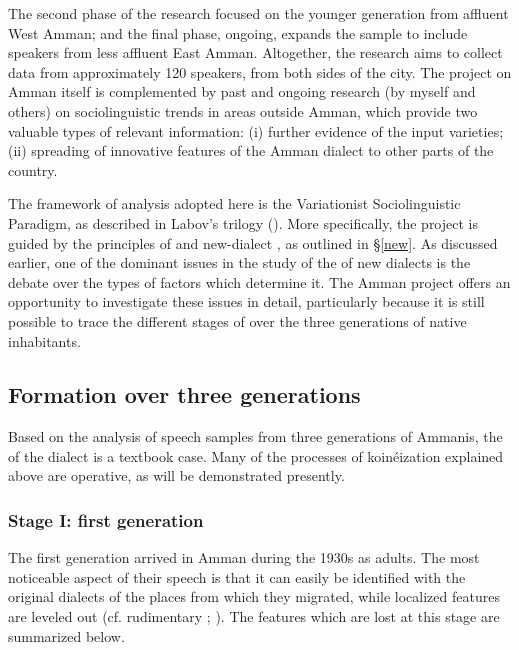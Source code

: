\documentclass[output=paper]{langsci/langscibook}
\begin{document}
The second phase of the research focused on the younger generation from affluent West Amman; and the final phase, ongoing, expands the sample to include speakers from less affluent East Amman. Altogether, the research aims to collect data from approximately 120 speakers, from both sides of the city. The project on Amman itself is complemented by past and ongoing research (by myself and others) on sociolinguistic trends in areas outside Amman, which provide two valuable types of relevant information: (i) further evidence of the input varieties; (ii) spreading of innovative features of the Amman dialect to other parts of the country.

The framework of analysis adopted here is the Variationist Sociolinguistic Paradigm, as described in Labov’s trilogy (\citeyear{Labov1994,Labov2001,Labov2010}). More specifically, the project is guided by the principles of  and new-dialect , as outlined in §\ref{new}. As discussed earlier, one of the dominant issues in the study of the  of new dialects is the debate over the types of factors which determine it. The Amman project offers an opportunity to investigate these issues in detail, particularly because it is still possible to trace the different stages of  over the three generations of native inhabitants.

\subsection{Formation over three generations} \label{three}

Based on the analysis of speech samples from three generations of Ammanis, the  of the dialect is a textbook case. Many of the processes of koinéization explained above are operative, as will be demonstrated presently.

\subsubsection{Stage I: first generation}

The first generation arrived in Amman during the 1930s as adults. The most noticeable aspect of their speech is that it can easily be identified with the original dialects of the places from which they migrated, while localized features are leveled out (cf. rudimentary ; \citealt{Trudgill2004}). The features which are lost at this stage are summarized below.
\end{document}
